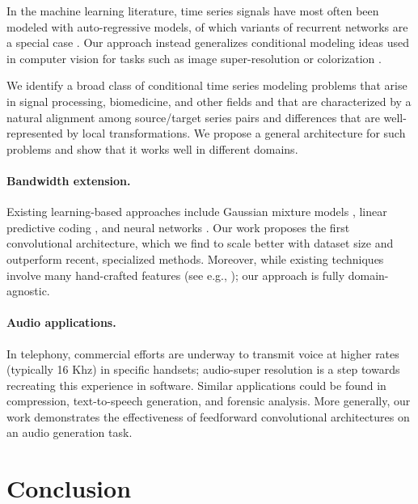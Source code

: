 \documentclass{article} \usepackage{iclr2017_workshop,times}
\begin{document}
In the machine learning literature, time series signals have most often been modeled with auto-regressive models, of which variants of recurrent networks are a special case \citep{gers2001applying,45168,mehri2016samplernn}.
Our approach instead generalizes conditional modeling ideas used in computer vision for tasks such as
image super-resolution \citep{Dong:2016:ISU:2914182.2914303,DBLP:journals/corr/LedigTHCATTWS16} or colorization \citep{zhang2016colorful}. 

We identify a broad class of conditional time series modeling problems that arise in signal processing, biomedicine, and other fields and that are characterized by a natural alignment among source/target series pairs and differences that are well-represented by local transformations. We propose a general architecture for such problems and show that it works well in different domains. 


\paragraph{Bandwidth extension.}

Existing learning-based approaches include Gaussian mixture models \citep{cheng1994statistical,park2000narrowband,pulakka2011speech}, linear predictive coding \citep{bradbury2000linear}, and neural networks \citep{li2015dnn}. 
Our work proposes the first convolutional architecture, which we find to scale better with dataset size and outperform recent, specialized methods.
Moreover, while existing techniques involve many hand-crafted features (see e.g., \citet{pulakka2011speech}); our approach is fully domain-agnostic.





\paragraph{Audio applications.} In telephony, commercial efforts are underway to transmit voice at higher rates (typically 16 Khz) in specific handsets; audio-super resolution is a step towards recreating this experience in software. Similar applications could be found in compression, text-to-speech generation, and forensic analysis.
More generally, our work demonstrates the effectiveness of feedforward convolutional architectures on an audio generation task.

\section{Conclusion}
\end{document}
